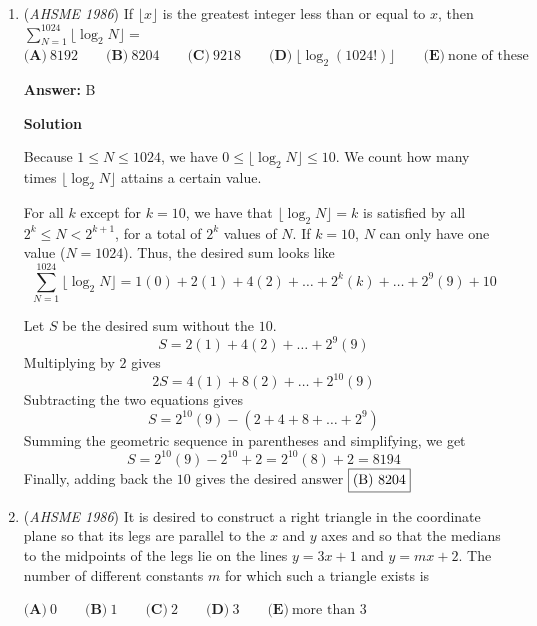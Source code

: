 \begin{enumerate}
 \textbf{Answer: }D



\textbf{Solution}

$p(x)$ must be a factor of $3(x^4+6x^2+25)-(3x^4+4x^2+28x+5)=14x^2-28x+70=14(x^2-2x+5)$.

 Therefore $p(x)=x^2 -2x+5$ and $p(1)=4$.

 The answer is $\fbox{(D) 4}$.

 


	\item (\textit{AHSME 1986}) If $\lfloor x\rfloor$ is the greatest integer less than or equal to $x$, then
$\sum_{N=1}^{1024} \lfloor \log_{2}N\rfloor =$
$\textbf{(A)}\ 8192\qquad \textbf{(B)}\ 8204\qquad \textbf{(C)}\ 9218\qquad \textbf{(D)}\ \lfloor\log_{2}(1024!)\rfloor\qquad \textbf{(E)}\ \text{none of these}$

 \textbf{Answer: }B



\textbf{Solution}

Because $1 \le N \le 1024$, we have $0 \le \lfloor \log_{2}N\rfloor \le 10$. We count how many times $\lfloor \log_{2}N\rfloor$ attains a certain value. 

 For all $k$ except for $k=10$, we have that $\lfloor \log_{2}N\rfloor = k$ is satisfied by all $2^k \le N<2^{k+1}$, for a total of $2^k$ values of $N$. If $k=10$, $N$ can only have one value ($N=1024$). Thus, the desired sum looks like 
 \[\sum_{N=1}^{1024} \lfloor \log_{2}N\rfloor =1(0)+2(1)+4(2)+\dots+2^k(k)+\dots+2^{9}(9)+10\]

 Let $S$ be the desired sum without the $10$. 
 \[S=2(1)+4(2)+\dots+2^{9}(9)\] Multiplying by $2$ gives 
 \[2S=4(1)+8(2)+\dots+2^{10}(9)\] Subtracting the two equations gives 
 \[S=2^{10}(9)-(2+4+8+\dots+2^9)\] Summing the geometric sequence in parentheses and simplifying, we get 
 \[S=2^{10}(9)-2^{10}+2=2^{10}(8)+2=8194\] Finally, adding back the $10$ gives the desired answer $\fbox{(B) 8204}$



	\item (\textit{AHSME 1986}) It is desired to construct a right triangle in the coordinate plane so that its legs are parallel 
to the $x$ and $y$ axes and so that the medians to the midpoints of the legs lie on the lines $y = 3x + 1$
and $y = mx + 2$. The number of different constants $m$ for which such a triangle exists is


 $\textbf{(A)}\ 0\qquad \textbf{(B)}\ 1\qquad \textbf{(C)}\ 2\qquad \textbf{(D)}\ 3\qquad \textbf{(E)}\ \text{more than 3}$


\end{enumerate}
